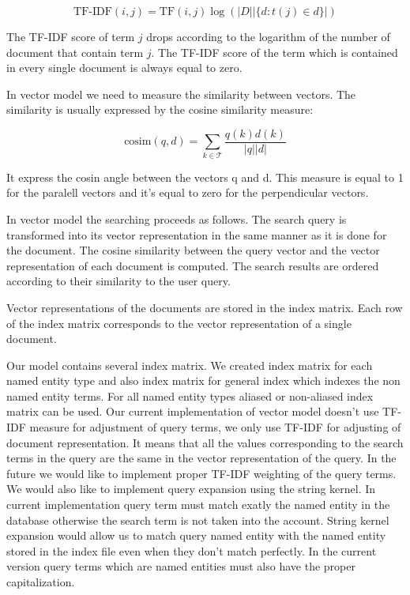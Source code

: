 \[\text{TF-IDF}(i,j) = \text{TF}(i,j)\log{(|D| |\lbrace d : t(j) \in d \rbrace|)}\]

The TF-IDF score of term $j$ drops according to the logarithm of the number of document that contain term $j$. The TF-IDF score of the term which is contained in every single document is always equal to zero.


In vector model we need to measure the similarity between vectors. The similarity is usually expressed by the cosine similarity measure:

\[\text{cosim}(q,d) = \sum_{k \in \mathcal{T}}\frac{q(k)d(k)}{|q||d|}\]

It express the cosin angle between the vectors q and d. This measure is equal to 1 for the paralell vectors and it's equal to zero for the perpendicular vectors.

In vector model the searching proceeds as follows. The search query is transformed into its vector representation in the same manner as it is done for the document. The cosine similarity between the query vector and the vector representation of each document is computed. The search results are ordered according to their similarity to the user query.  

Vector representations of the documents are stored in the index matrix. Each row of the index matrix corresponds to the vector representation of a single document. 

Our model contains several index matrix. We created index matrix for each named entity type and also index matrix for general index which indexes the non named entity terms. For all named entity types aliased or non-aliased index matrix can be used. Our current implementation of vector model doesn't use TF-IDF measure for adjustment of query terms, we only use TF-IDF for adjusting of document representation. It means that all the values corresponding to the search terms in the query are the same in the vector representation of the query. In the future we would like to implement proper TF-IDF weighting of the query terms.  We would also like to implement query expansion using the string kernel. In current implementation query term must match exatly the named entity in the database otherwise the search term is not taken into the account. String kernel expansion would allow us to match query named entity with the named entity stored in the index file even when they don't match perfectly. In the current version query terms which are named entities must also have the proper capitalization.

